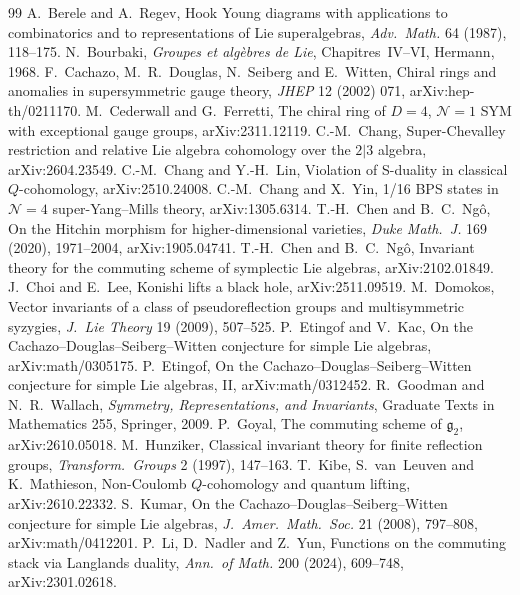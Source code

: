 \documentclass[11pt]{article}
\theoremstyle{definition}
\newcommand{\g}{\mathfrak g}
\begin{document}
\begin{thebibliography}{99}\small
{} A.~Berele and A.~Regev, Hook Young diagrams with applications to combinatorics and to representations of Lie superalgebras, \emph{Adv.\ Math.} 64 (1987), 118--175.
 N.~Bourbaki, \emph{Groupes et alg\`ebres de Lie}, Chapitres~IV--VI, Hermann, 1968.
 F.~Cachazo, M.~R.~Douglas, N.~Seiberg and E.~Witten, Chiral rings and anomalies in supersymmetric gauge theory, \emph{JHEP} 12 (2002) 071, arXiv:hep-th/0211170.
 M.~Cederwall and G.~Ferretti, The chiral ring of $D=4$, $\mathcal N=1$ SYM with exceptional gauge groups, arXiv:2311.12119.
 C.-M.~Chang, Super-Chevalley restriction and relative Lie algebra cohomology over the $2|3$ algebra, arXiv:2604.23549.
 C.-M.~Chang and Y.-H.~Lin, Violation of S-duality in classical $Q$-cohomology, arXiv:2510.24008.
 C.-M.~Chang and X.~Yin, 1/16 BPS states in $\mathcal N=4$ super-Yang--Mills theory, arXiv:1305.6314.
 T.-H.~Chen and B.~C.~Ng\^o, On the Hitchin morphism for higher-dimensional varieties, \emph{Duke Math.\ J.} 169 (2020), 1971--2004, arXiv:1905.04741.
 T.-H.~Chen and B.~C.~Ng\^o, Invariant theory for the commuting scheme of symplectic Lie algebras, arXiv:2102.01849.
 J.~Choi and E.~Lee, Konishi lifts a black hole, arXiv:2511.09519.
 M.~Domokos, Vector invariants of a class of pseudoreflection groups and multisymmetric syzygies, \emph{J.\ Lie Theory} 19 (2009), 507--525.
 P.~Etingof and V.~Kac, On the Cachazo--Douglas--Seiberg--Witten conjecture for simple Lie algebras, arXiv:math/0305175.
 P.~Etingof, On the Cachazo--Douglas--Seiberg--Witten conjecture for simple Lie algebras, II, arXiv:math/0312452.
 R.~Goodman and N.~R.~Wallach, \emph{Symmetry, Representations, and Invariants}, Graduate Texts in Mathematics 255, Springer, 2009.
 P.~Goyal, The commuting scheme of $\g_2$, arXiv:2610.05018.
 M.~Hunziker, Classical invariant theory for finite reflection groups, \emph{Transform.\ Groups} 2 (1997), 147--163.
 T.~Kibe, S.~van~Leuven and K.~Mathieson, Non-Coulomb $Q$-cohomology and quantum lifting, arXiv:2610.22332.
 S.~Kumar, On the Cachazo--Douglas--Seiberg--Witten conjecture for simple Lie algebras, \emph{J.\ Amer.\ Math.\ Soc.} 21 (2008), 797--808, arXiv:math/0412201.
 P.~Li, D.~Nadler and Z.~Yun, Functions on the commuting stack via Langlands duality, \emph{Ann.\ of Math.} 200 (2024), 609--748, arXiv:2301.02618.

\end{thebibliography}
\end{document}
